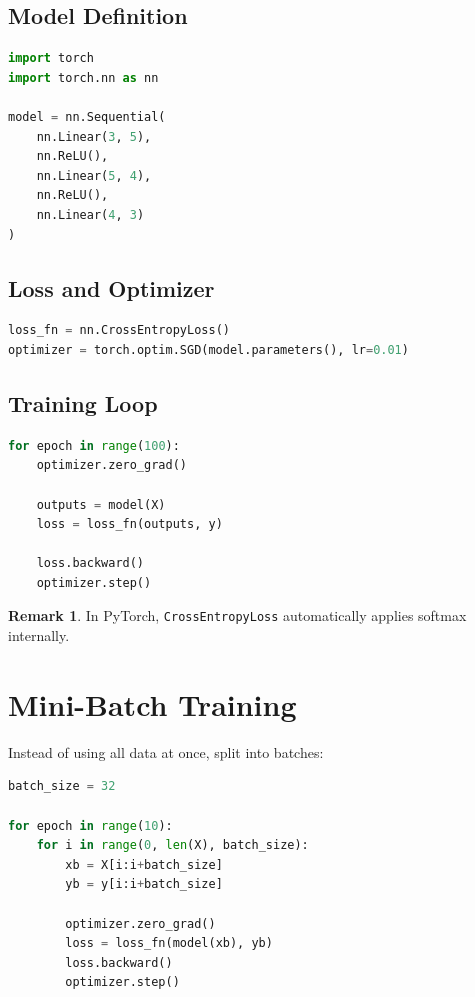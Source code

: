 \documentclass[12pt,oneside]{book}
\numberwithin{equation}{section}
\theoremstyle{definition}
\newtheorem{remark}{Remark}[section]
\theoremstyle{plain}
\theoremstyle{remark}
\begin{document}
\subsection{Model Definition}

\begin{lstlisting}[language=Python]
import torch
import torch.nn as nn

model = nn.Sequential(
    nn.Linear(3, 5),
    nn.ReLU(),
    nn.Linear(5, 4),
    nn.ReLU(),
    nn.Linear(4, 3)
)
\end{lstlisting}

\subsection{Loss and Optimizer}

\begin{lstlisting}[language=Python]
loss_fn = nn.CrossEntropyLoss()
optimizer = torch.optim.SGD(model.parameters(), lr=0.01)
\end{lstlisting}

\subsection{Training Loop}

\begin{lstlisting}[language=Python]
for epoch in range(100):
    optimizer.zero_grad()

    outputs = model(X)
    loss = loss_fn(outputs, y)

    loss.backward()
    optimizer.step()
\end{lstlisting}

\begin{remark}
In PyTorch, \texttt{CrossEntropyLoss} automatically applies softmax internally.
\end{remark}

\section{Mini-Batch Training}

Instead of using all data at once, split into batches:
\begin{lstlisting}[language=Python]
batch_size = 32

for epoch in range(10):
    for i in range(0, len(X), batch_size):
        xb = X[i:i+batch_size]
        yb = y[i:i+batch_size]

        optimizer.zero_grad()
        loss = loss_fn(model(xb), yb)
        loss.backward()
        optimizer.step()
\end{lstlisting}
\end{document}
